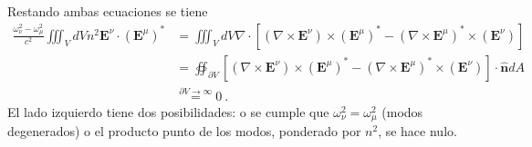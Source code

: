 Restando ambas ecuaciones se tiene
\begin{align*}
	\frac{ \omega_\nu^2 - \omega_\mu^2}{c^2} \iiint_V dV n^2 \textbf{E}^\nu \cdot \left(\textbf{E}^\mu\right)^*
	&= \iiint_V dV \nabla \cdot \left[ \left(\nabla\times\textbf{E}^\nu\right) \times \left(\textbf{E}^\mu \right)^* - \left(\nabla\times\textbf{E}^\mu\right)^* \times \left(\textbf{E}^\nu \right) \right]
	\\
	&= \oiint_{\partial V}  \left[ \left(\nabla\times\textbf{E}^\nu\right) \times \left(\textbf{E}^\mu \right)^* - \left(\nabla\times\textbf{E}^\mu\right)^* \times \left(\textbf{E}^\nu \right) \right] \cdot \hat{\textbf{n}} dA
	\\
	&\overset{\partial V \to \infty}{=}
	0 \ .
\end{align*}
El lado izquierdo tiene dos posibilidades: o se cumple que $\omega_\nu^2 = \omega_\mu^2$ (modos degenerados) o el producto punto de los modos, ponderado por $n^2$, se hace nulo.